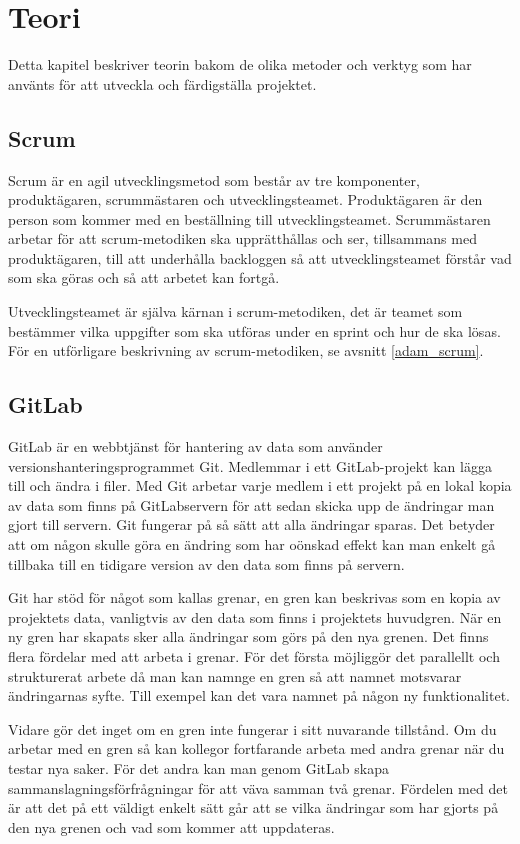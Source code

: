 \chapter{Teori}
Detta kapitel beskriver teorin bakom de olika metoder och verktyg som har använts för att utveckla och färdigställa projektet.

\section{Scrum} \label{scrum}
Scrum är en agil utvecklingsmetod som består av tre komponenter, produktägaren, scrummästaren och utvecklingsteamet.
Produktägaren är den person som kommer med en beställning till utvecklingsteamet.
Scrummästaren arbetar för att scrum-metodiken ska upprätthållas och ser, tillsammans med produktägaren, till att underhålla backloggen så att utvecklingsteamet förstår vad som ska göras och så att arbetet kan fortgå.

Utvecklingsteamet är själva kärnan i scrum-metodiken, det är teamet som bestämmer vilka uppgifter som ska utföras under en sprint och hur de ska lösas.
För en utförligare beskrivning av scrum-metodiken, se avsnitt \ref{adam_scrum}.

\section{GitLab}
GitLab är en webbtjänst för hantering av data som använder versionshanteringsprogrammet Git. Medlemmar i ett GitLab-projekt kan lägga till och ändra i filer.
Med Git arbetar varje medlem i ett projekt på en lokal kopia av data som finns på GitLabservern för att sedan skicka upp de ändringar man gjort till servern. Git fungerar på så sätt att alla ändringar sparas. Det betyder att om någon skulle göra en ändring som har oönskad effekt kan man enkelt gå tillbaka till en tidigare version av den data som finns på servern.

Git har stöd för något som kallas grenar, en gren kan beskrivas som en kopia av projektets data, vanligtvis av den data som finns i projektets huvudgren. När en ny gren har skapats sker alla ändringar som görs på den nya grenen. Det finns flera fördelar med att arbeta i grenar. För det första möjliggör det parallellt och strukturerat arbete då man kan namnge en gren så att namnet motsvarar ändringarnas syfte. Till exempel kan det vara namnet på någon ny funktionalitet.

Vidare gör det inget om en gren inte fungerar i sitt nuvarande tillstånd. Om du arbetar med en gren så kan kollegor fortfarande arbeta med andra grenar när du testar nya saker.
För det andra kan man genom GitLab skapa sammanslagningsförfrågningar för att väva samman två grenar.
Fördelen med det är att det på ett väldigt enkelt sätt går att se vilka ändringar som har gjorts på den nya grenen och vad som kommer att uppdateras.

